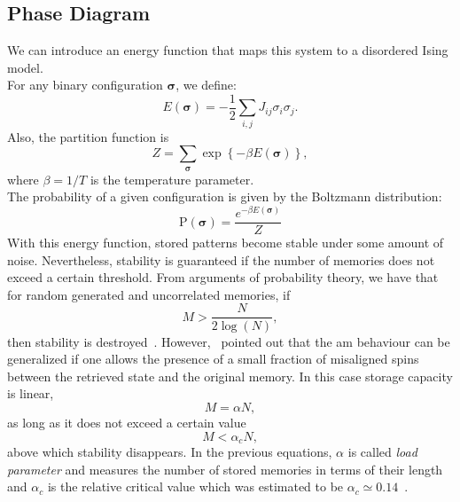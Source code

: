 \documentclass[\rootdir/main.tex]{subfiles}
\begin{document}
\subsection{Phase Diagram}
We can introduce an energy function that maps this system to a disordered Ising model.\\
For any binary configuration $\symbf{\sigma}$, we define:
\begin{equation}\label{eq:energy_ising}
    E(\symbf{\sigma}) = - \frac{1}{2} \sum_{i, j} J_{ij} \sigma_i \sigma_j.
\end{equation}
Also, the partition function is
\begin{equation}\label{eq:prob_configuration}
    Z = \sum_{\symbf{\sigma}} \exp\left\{- \beta E(\symbf{\sigma}) \right\},
\end{equation}
where $\beta = 1/T$ is the temperature parameter.\\
The probability of a given configuration is given by the Boltzmann distribution:
\begin{equation}
    \mathrm{P}(\symbf{\sigma}) = \frac{e^{- \beta E(\symbf{\sigma})}}{Z}
\end{equation}
With this energy function, stored patterns become stable under some amount of noise. Nevertheless, stability is guaranteed if the number of memories does not exceed a certain threshold. From arguments of probability theory, we have that for random generated and uncorrelated memories, if
\begin{equation*}
    M > \frac{N}{2 \log \left( N\right)},
\end{equation*}
then stability is destroyed~\cite{hopfield_capacity}. However,~\textcite{JJHop} pointed out that the \acrlong{am} behaviour can be generalized if one allows the presence of a small fraction of misaligned spins between the retrieved state and the original memory. In this case storage capacity is linear,
\begin{equation}\label{eq:storage_capacity}
    M = \alpha N,
\end{equation}
as long as it does not exceed a certain value
\begin{equation}\label{eq:storage_condition}
    M < \alpha_c N,
\end{equation}
above which stability disappears. In the previous equations, $\alpha$ is called \emph{load parameter} and measures the number of stored memories in terms of their length and $\alpha_c$ is the relative critical value which was estimated to be $\alpha_c \simeq 0.14$~\cite{amit_phase, amit2, amit_1989}.\\
\end{document}
